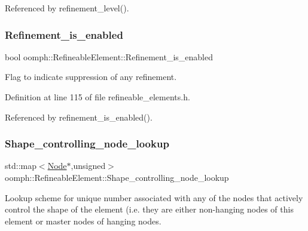 Referenced by refinement\+\_\+level().

\mbox{\label{classoomph_1_1RefineableElement_ae2349ec047d219be786ecdcb80389b1d}} 
\subsubsection{\texorpdfstring{Refinement\+\_\+is\+\_\+enabled}{Refinement\_is\_enabled}}
{\footnotesize\ttfamily bool oomph\+::\+Refineable\+Element\+::\+Refinement\+\_\+is\+\_\+enabled\hspace{0.3cm}{\ttfamily [protected]}}



Flag to indicate suppression of any refinement. 



Definition at line 115 of file refineable\+\_\+elements.\+h.



Referenced by refinement\+\_\+is\+\_\+enabled().

\mbox{\label{classoomph_1_1RefineableElement_abe7c83069bd7798d1667b1926f9bc028}} 
\subsubsection{\texorpdfstring{Shape\+\_\+controlling\+\_\+node\+\_\+lookup}{Shape\_controlling\_node\_lookup}}
{\footnotesize\ttfamily std\+::map$<$\hyperlink{classoomph_1_1Node}{Node}$\ast$,unsigned$>$ oomph\+::\+Refineable\+Element\+::\+Shape\+\_\+controlling\+\_\+node\+\_\+lookup\hspace{0.3cm}{\ttfamily [private]}}



Lookup scheme for unique number associated with any of the nodes that actively control the shape of the element (i.\+e. they are either non-\/hanging nodes of this element or master nodes of hanging nodes. 




